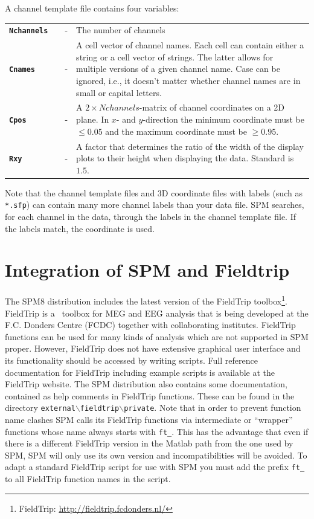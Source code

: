 A channel template file contains four variables:\\

\begin{tabular}{llcp{9cm}}

{\bf \texttt{Nchannels}} & &  - & The number of channels\\

{\bf \texttt{Cnames}}&  & - & A cell vector of channel names. Each cell can contain either a string or a cell vector of strings. The latter allows
for multiple versions of a given channel name. Case can be ignored, i.e., it doesn't matter whether channel names are in small or capital letters.\\

{\bf \texttt{Cpos}} & & - & A $2 \times Nchannels$-matrix of channel coordinates on a 2D plane. In $x$- and $y$-direction the minimum coordinate must be $\leq 0.05$ and the maximum coordinate must be $\geq 0.95$. \\

{\bf \texttt{Rxy}} & & - & A factor that determines the ratio of the width of the display plots to their height when displaying the data. Standard is $1.5$. \\

\end{tabular}

Note that the channel template files and 3D coordinate files with labels (such as \texttt{*.sfp}) can contain many more channel labels than your data file. SPM searches, for each channel in the data, through the labels in the channel template file. If the labels match, the coordinate is used.

\section{Integration of SPM and Fieldtrip}
The SPM8 distribution includes the latest version of the FieldTrip toolbox\footnote{FieldTrip: \url{http://fieldtrip.fcdonders.nl/}}. FieldTrip is a \matlab\ toolbox for MEG and EEG analysis that is being developed at the F.C. Donders Centre (FCDC) together with collaborating institutes. FieldTrip functions can be used for many kinds of analysis which are not supported in SPM proper. However, FieldTrip does not have extensive graphical user interface and its functionality should be accessed by writing scripts. Full reference documentation for FieldTrip including example scripts is available at the FieldTrip website. The SPM distribution also contains some documentation, contained as help comments in FieldTrip functions. These can be found in the directory \texttt{external$\backslash$fieldtrip$\backslash$private}. Note that in order to prevent function name clashes SPM calls its FieldTrip functions via intermediate or ``wrapper'' functions whose name always starts with \texttt{ft\_}. This has the advantage that even if there is a different FieldTrip version in the Matlab path from the one used by SPM, SPM will only use its own version and incompatibilities will be avoided. To adapt a standard FieldTrip script for use with SPM you must add the prefix \texttt{ft\_} to all FieldTrip function names in the script.

